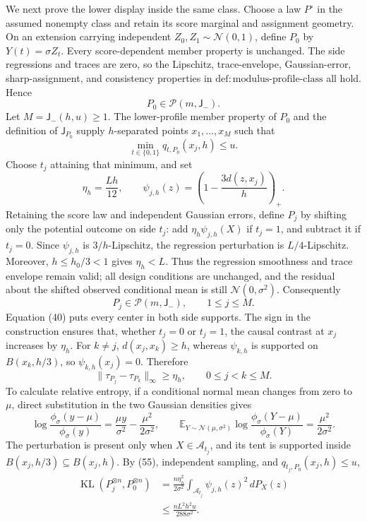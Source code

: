 We next prove the lower display inside the same class.  Choose a law \(P^\circ\) in the assumed nonempty class and retain its score marginal and assignment geometry.  On an extension carrying independent \(Z_0,Z_1\sim\mathcal N(0,1)\), define \(P_0\) by \(Y(t)=\sigma Z_t\).  Every score-dependent member property is unchanged.  The side regressions and traces are zero, so the Lipschitz, trace-envelope, Gaussian-error, sharp-assignment, and consistency properties in \(\mathrm{def:modulus\text{-}profile\text{-}class}\) all hold.  Hence
\[
 P_0\in\mathcal P(m,\mathsf J_{-}). \tag{51}
\]
Let \(M=\mathsf J_{-}(h,u)\ge1\).  The lower-profile member property of \(P_0\) and the definition of \(\mathsf J_{P_0}\) supply \(h\)-separated points \(x_1,\ldots,x_M\) such that
\[
 \min_{t\in\{0,1\}}q_{t,P_0}(x_j,h)\le u.
\]
Choose \(t_j\) attaining that minimum, and set
\[
 \eta_h=\frac{Lh}{12},
 \qquad
 \psi_{j,h}(z)=\left(1-\frac{3d(z,x_j)}h\right)_+ . \tag{52}
\]
Retaining the score law and independent Gaussian errors, define \(P_j\) by shifting only the potential outcome on side \(t_j\): add \(\eta_h\psi_{j,h}(X)\) if \(t_j=1\), and subtract it if \(t_j=0\).  Since \(\psi_{j,h}\) is \(3/h\)-Lipschitz, the regression perturbation is \(L/4\)-Lipschitz.  Moreover, \(h\le h_0/3<1\) gives \(\eta_h<L\).  Thus the regression smoothness and trace envelope remain valid; all design conditions are unchanged, and the residual about the shifted observed conditional mean is still \(\mathcal N(0,\sigma^2)\).  Consequently
\[
 P_j\in\mathcal P(m,\mathsf J_{-}),
 \qquad 1\le j\le M. \tag{53}
\]
Equation (40) puts every center in both side supports.  The sign in the construction ensures that, whether \(t_j=0\) or \(t_j=1\), the causal contrast at \(x_j\) increases by \(\eta_h\).  For \(k\ne j\), \(d(x_j,x_k)\ge h\), whereas \(\psi_{k,h}\) is supported on \(B(x_k,h/3)\), so \(\psi_{k,h}(x_j)=0\).  Therefore
\[
 \|\tau_{P_j}-\tau_{P_k}\|_\infty\ge\eta_h,
 \qquad 0\le j<k\le M. \tag{54}
\]
To calculate relative entropy, if a conditional normal mean changes from zero to \(\mu\), direct substitution in the two Gaussian densities gives
\[
 \log\frac{\phi_\sigma(y-\mu)}{\phi_\sigma(y)}
 =\frac{\mu y}{\sigma^2}-\frac{\mu^2}{2\sigma^2},
 \qquad
 \mathbb E_{Y\sim\mathcal N(\mu,\sigma^2)}
 \log\frac{\phi_\sigma(Y-\mu)}{\phi_\sigma(Y)}
 =\frac{\mu^2}{2\sigma^2}. \tag{55}
\]
The perturbation is present only when \(X\in\mathcal A_{t_j}\), and its tent is supported inside \(B(x_j,h/3)\subseteq B(x_j,h)\).  By (55), independent sampling, and \(q_{t_j,P_0}(x_j,h)\le u\),
\[
 \begin{aligned}
 \operatorname{KL}(P_j^{\otimes n},P_0^{\otimes n})
 &=\frac{n\eta_h^2}{2\sigma^2}
 \int_{\mathcal A_{t_j}}\psi_{j,h}(z)^2\,dP_X(z)\\
 &\le\frac{nL^2h^2u}{288\sigma^2}. 
 \end{aligned} \tag{56}
\]
